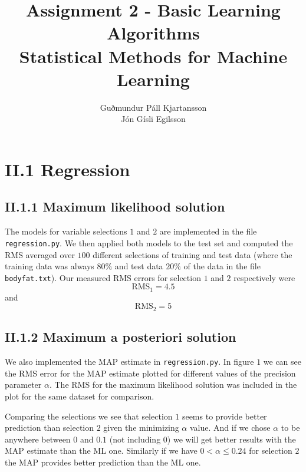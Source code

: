 \documentclass[a4paper,10pt]{article}
\title{
	Assignment 2 - Basic Learning Algorithms	\\
	Statistical Methods for Machine Learning
  }
\author{
	Guðmundur Páll Kjartansson \\
	Jón Gísli Egilsson
}
\begin{document}
\maketitle

\section*{II.1 Regression}

\subsection*{II.1.1 Maximum likelihood solution}

The models for variable selections $1$ and $2$ are implemented in the file \verb=regression.py=. We then applied both models to the test set and computed the RMS averaged over $100$ different selections of training and test data (where the training data was always $80\%$ and test data $20\%$ of the data in the file \verb=bodyfat.txt=). Our measured RMS errors for selection $1$ and $2$ respectively were
$$\text{RMS}_1 = 4.5$$
and
$$\text{RMS}_2 = 5$$

\subsection*{II.1.2 Maximum a posteriori solution}

We also implemented the MAP estimate in \verb=regression.py=. In figure $1$ we can see the RMS error for the MAP estimate plotted for different values of the precision parameter $\alpha$. The RMS for the maximum likelihood solution was included in the plot for the same dataset for comparison.

Comparing the selections we see that selection $1$ seems to provide better prediction than selection $2$ given the minimizing $\alpha$ value. And if we chose $\alpha$ to be anywhere between $0$ and $0.1$ (not including $0$) we will get better results with the MAP estimate than the ML one. Similarly if we have $0 < \alpha \leq 0.24$ for selection $2$ the MAP provides better prediction than the ML one.
\end{document}
